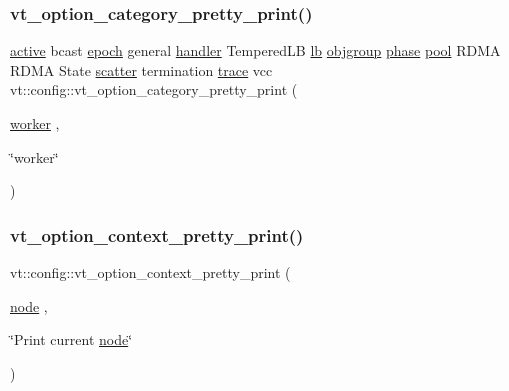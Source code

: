 \subsubsection{\texorpdfstring{vt\+\_\+option\+\_\+category\+\_\+pretty\+\_\+print()}{vt\_option\_category\_pretty\_print()}\hspace{0.1cm}{\footnotesize\ttfamily [17/17]}}
{\footnotesize\ttfamily \hyperlink{namespacevt_1_1config_a6bd1d6215bda0d8ca02811798399f689a82f77c67af0c363709010c6df4dbd920}{active} bcast \hyperlink{namespacevt_1_1config_a6bd1d6215bda0d8ca02811798399f689a05bdb92281360bcbfdf239ad3ccbde19}{epoch} general \hyperlink{namespacevt_1_1config_a6bd1d6215bda0d8ca02811798399f689a82a0081a94d5c5dfd18b0b3f7eca64b7}{handler} Tempered\+LB \hyperlink{namespacevt_1_1config_a6bd1d6215bda0d8ca02811798399f689aecb25779c74e06cc3e6baf03ed8289ed}{lb} \hyperlink{namespacevt_1_1config_a6bd1d6215bda0d8ca02811798399f689a338198b4d813c2e8d709e0015fc40d45}{objgroup} \hyperlink{namespacevt_1_1config_a6bd1d6215bda0d8ca02811798399f689ab2d71eabd52b3ba898df5e1ee6a20089}{phase} \hyperlink{namespacevt_1_1config_a6bd1d6215bda0d8ca02811798399f689a50ba0efa092380eb92cee1d921d6e40f}{pool} R\+D\+MA R\+D\+MA State \hyperlink{namespacevt_1_1config_a6bd1d6215bda0d8ca02811798399f689ab0821d060501c20d94b8d700df7fdd76}{scatter} termination \hyperlink{namespacevt_1_1config_a6bd1d6215bda0d8ca02811798399f689aa14cb3132cde2e74239755b4c3944f43}{trace} vcc vt\+::config\+::vt\+\_\+option\+\_\+category\+\_\+pretty\+\_\+print (\begin{DoxyParamCaption}\item[{\hyperlink{namespacevt_1_1config_a6bd1d6215bda0d8ca02811798399f689a24771d4179e70d6e207872dbca07e2ef}{worker}}]{,  }\item[{\char`\"{}worker\char`\"{}}]{ }\end{DoxyParamCaption})}

\mbox{\label{namespacevt_1_1config_a7318827247b6fe5313529e7c8b2a9a28}} 
\subsubsection{\texorpdfstring{vt\+\_\+option\+\_\+context\+\_\+pretty\+\_\+print()}{vt\_option\_context\_pretty\_print()}}
{\footnotesize\ttfamily vt\+::config\+::vt\+\_\+option\+\_\+context\+\_\+pretty\+\_\+print (\begin{DoxyParamCaption}\item[{\hyperlink{namespacevt_1_1config_a46e57c33bee1b9f1fa95455af86d80e0a576033c81e2ddd03d721ecef3b1b3f81}{node}}]{,  }\item[{\char`\"{}Print current \hyperlink{namespacevt_1_1config_a46e57c33bee1b9f1fa95455af86d80e0a576033c81e2ddd03d721ecef3b1b3f81}{node}\char`\"{}}]{ }\end{DoxyParamCaption})}

